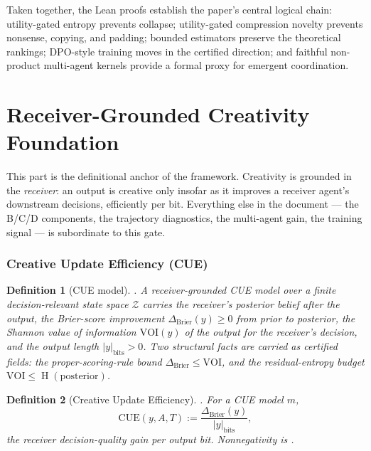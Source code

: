 \documentclass[11pt]{article}
\newtheorem{definition}{Definition}
\theoremstyle{remark}
\newcommand{\Ent}{\operatorname{H}}
\newcommand{\LeanName}[1]{\texttt{\detokenize{#1}}}
\begin{document}
Taken together, the Lean proofs establish the paper's central logical chain:
utility-gated entropy prevents collapse; utility-gated compression novelty
prevents nonsense, copying, and padding; bounded estimators preserve the
theoretical rankings; DPO-style training moves in the certified direction; and
faithful non-product multi-agent kernels provide a formal proxy for emergent
coordination.


\part{Receiver-Grounded Creativity Foundation}
\label{part:cue}

\noindent
This part is the definitional anchor of the framework. Creativity is grounded
in the \emph{receiver}: an output is creative only insofar as it improves a
receiver agent's downstream decisions, efficiently per bit. Everything else in
the document --- the B/C/D components, the trajectory diagnostics, the
multi-agent gain, the training signal --- is subordinate to this gate.

\section{Creative Update Efficiency (CUE)}

\begin{definition}[CUE model]
\LeanName{CUEModel}. A receiver-grounded CUE model over a finite
decision-relevant state space $\mathcal{Z}$ carries the receiver's posterior
belief after the output, the Brier-score improvement
$\Delta_{\mathrm{Brier}}(y) \ge 0$ from prior to posterior, the Shannon value
of information $\mathrm{VOI}(y)$ of the output for the receiver's decision,
and the output length $|y|_{\mathrm{bits}} > 0$. Two structural facts are
carried as certified fields: the proper-scoring-rule bound
$\Delta_{\mathrm{Brier}} \le \mathrm{VOI}$, and the residual-entropy budget
$\mathrm{VOI} \le \Ent(\mathrm{posterior})$.
\end{definition}

\begin{definition}[Creative Update Efficiency]
\LeanName{cue}. For a CUE model $m$,
\[
  \mathrm{CUE}(y, A, T)
  :=
  \frac{\Delta_{\mathrm{Brier}}(y)}{|y|_{\mathrm{bits}}},
\]
the receiver decision-quality gain per output bit. Nonnegativity is
\LeanName{cue_nonneg}.
\end{definition}
\end{document}

